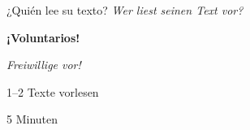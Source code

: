 \documentclass[aspectratio=169, 11pt]{beamer}
\newcommand{\seriftext}[1]{{\fontfamily{ppl}\selectfont #1}}
\newcommand{\es}[1]{\seriftext{\textbf{#1}}}
\newcommand{\de}[1]{\textit{\textcolor{mittelgrau}{#1}}}
\newcommand{\zeit}[1]{{\small\textcolor{mittelgrau}{#1}}}
\begin{document}

\begin{frame}{¿Quién lee su texto? \de{Wer liest seinen Text vor?}}
    \vspace{1.5cm}

    \begin{center}
        {\Huge\es{¡Voluntarios!}}

        \vspace{1cm}

        {\Large\de{Freiwillige vor!}}

        \vspace{1cm}

        {\large 1--2 Texte vorlesen}

        \vspace{0.5cm}

        \zeit{5 Minuten}
    \end{center}
\end{frame}
\end{document}

